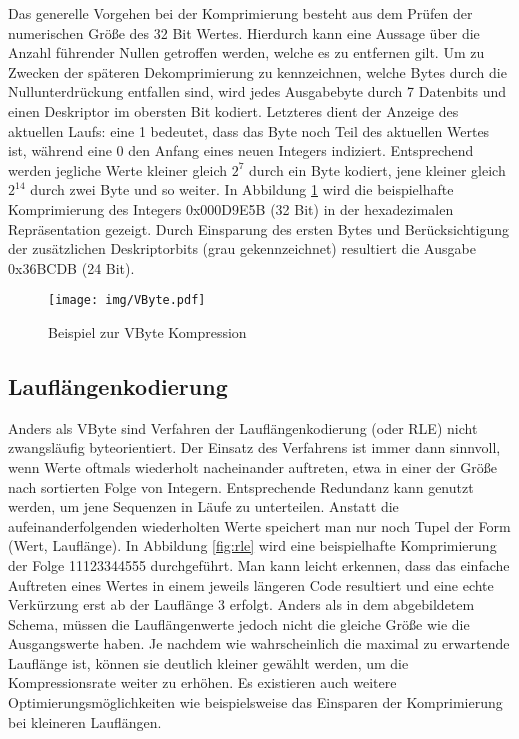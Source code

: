 Das generelle Vorgehen bei der Komprimierung besteht aus dem Prüfen der numerischen Größe des 32 Bit Wertes. Hierdurch kann eine Aussage über die Anzahl führender Nullen getroffen werden, welche es zu entfernen gilt. Um zu Zwecken der späteren Dekomprimierung zu kennzeichnen, welche Bytes durch die Nullunterdrückung entfallen sind, wird jedes Ausgabebyte durch 7 Datenbits und einen Deskriptor im obersten Bit kodiert. Letzteres dient der Anzeige des aktuellen Laufs: eine 1 bedeutet, dass das Byte noch Teil des aktuellen Wertes ist, während eine 0 den Anfang eines neuen Integers indiziert. Entsprechend werden jegliche Werte kleiner gleich $2^7$ durch ein Byte kodiert, jene kleiner gleich $2^{14}$ durch zwei Byte und so weiter. In Abbildung \ref{fig:vbyte} wird die beispielhafte Komprimierung des Integers 0x000D9E5B (32 Bit) in der hexadezimalen Repräsentation gezeigt. Durch Einsparung des ersten Bytes und Berücksichtigung der zusätzlichen Deskriptorbits (grau gekennzeichnet) resultiert die Ausgabe 0x36BCDB (24 Bit).

\begin{figure}
	\texttt{[image: img/VByte.pdf]}
	\centering
	\caption{Beispiel zur VByte Kompression}
	\label{fig:vbyte}
\end{figure}

\subsection{Lauflängenkodierung}

Anders als VByte sind Verfahren der Lauflängenkodierung (oder \ac{RLE}) nicht zwangsläufig byteorientiert. Der Einsatz des Verfahrens ist immer dann sinnvoll, wenn Werte oftmals wiederholt nacheinander auftreten, etwa in einer der Größe nach sortierten Folge von Integern. Entsprechende Redundanz kann genutzt werden, um jene Sequenzen in Läufe zu unterteilen. Anstatt die aufeinanderfolgenden wiederholten Werte speichert man nur noch Tupel der Form (Wert, Lauflänge). In Abbildung \ref{fig:rle} wird eine beispielhafte Komprimierung der Folge 11123344555 durchgeführt. Man kann leicht erkennen, dass das einfache Auftreten eines Wertes in einem jeweils längeren Code resultiert und eine echte Verkürzung erst ab der Lauflänge 3 erfolgt. Anders als in dem abgebildetem Schema, müssen die Lauflängenwerte jedoch nicht die gleiche Größe wie die Ausgangswerte haben. Je nachdem wie wahrscheinlich die maximal zu erwartende Lauflänge ist, können sie deutlich kleiner gewählt werden, um die Kompressionsrate weiter zu erhöhen. Es existieren auch weitere Optimierungsmöglichkeiten wie beispielsweise das Einsparen der Komprimierung bei kleineren Lauflängen.

